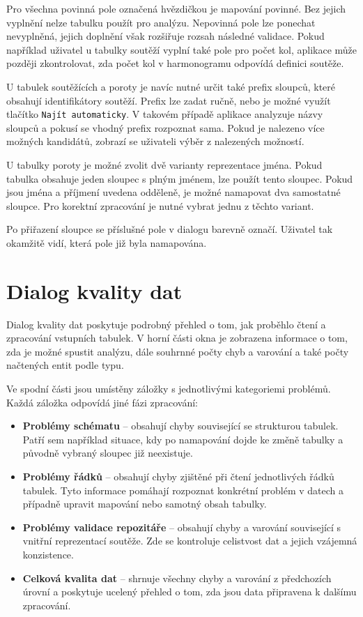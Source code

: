 \documentclass[czech, kiv, ba, he, iso690alph, pdf]{fasthesis}
\begin{document}
			Pro všechna povinná pole označená hvězdičkou je mapování povinné. Bez jejich vyplnění nelze tabulku použít pro analýzu. Nepovinná pole lze ponechat nevyplněná, jejich doplnění však rozšiřuje rozsah následné validace. Pokud například uživatel u tabulky soutěží vyplní také pole pro počet kol, aplikace může později zkontrolovat, zda počet kol v harmonogramu odpovídá definici soutěže.
	
			U tabulek soutěžících a poroty je navíc nutné určit také prefix sloupců, které obsahují identifikátory soutěží. Prefix lze zadat ručně, nebo je možné využít tlačítko \texttt{Najít automaticky}. V takovém případě aplikace analyzuje názvy sloupců a pokusí se vhodný prefix rozpoznat sama. Pokud je nalezeno více možných kandidátů, zobrazí se uživateli výběr z nalezených možností.
	
			U tabulky poroty je možné zvolit dvě varianty reprezentace jména. Pokud tabulka obsahuje jeden sloupec s plným jménem, lze použít tento sloupec. Pokud jsou jména a příjmení uvedena odděleně, je možné namapovat dva samostatné sloupce. Pro korektní zpracování je nutné vybrat jednu z těchto variant.
	
			Po přiřazení sloupce se příslušné pole v dialogu barevně označí. Uživatel tak okamžitě vidí, která pole již byla namapována.
	
		\section{Dialog kvality dat}
	
			Dialog kvality dat poskytuje podrobný přehled o tom, jak proběhlo čtení a zpracování vstupních tabulek. V horní části okna je zobrazena informace o tom, zda je možné spustit analýzu, dále souhrnné počty chyb a varování a také počty načtených entit podle typu.
	
			Ve spodní části jsou umístěny záložky s jednotlivými kategoriemi problémů. Každá záložka odpovídá jiné fázi zpracování:
			\begin{itemize}
				\item \textbf{Problémy schématu} -- obsahují chyby související se strukturou tabulek. Patří sem například situace, kdy po namapování dojde ke změně tabulky a původně vybraný sloupec již neexistuje.
				\item \textbf{Problémy řádků} -- obsahují chyby zjištěné při čtení jednotlivých řádků tabulek. Tyto informace pomáhají rozpoznat konkrétní problém v datech a případně upravit mapování nebo samotný obsah tabulky.
				\item \textbf{Problémy validace repozitáře} -- obsahují chyby a varování související s vnitřní reprezentací soutěže. Zde se kontroluje celistvost dat a jejich vzájemná konzistence.
				\item \textbf{Celková kvalita dat} -- shrnuje všechny chyby a varování z předchozích úrovní a poskytuje ucelený přehled o tom, zda jsou data připravena k dalšímu zpracování.
			\end{itemize}
	
\end{document}
